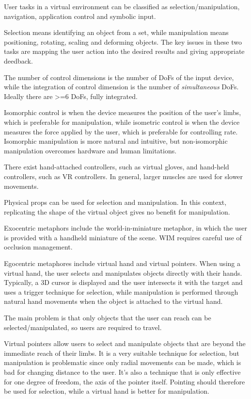 \documentclass[a4paper]{article}
\begin{document}
User tasks in a virtual environment can be classified as
selection/manipulation, navigation, application control and symbolic
input.

Selection means identifying an object from a set, while manipulation
means positioning, rotating, scaling and deforming objects. The key
issues in these two tasks are mapping the user action into the desired
results and giving appropriate deedback.

The number of control dimensions is the number of DoFs of the input
device, while the integration of control dimension is the number of
\emph{simultaneous} DoFs. Ideally there are \textgreater=6 DoFs, fully
integrated.

Isomorphic control is when the device measures the position of the
user's limbs, which is preferable for manipulation, while isometric
control is when the device measures the force applied by the user, which
is preferable for controlling rate. Isomorphic manipulation is more
natural and intuitive, but non-isomorphic manipulation overcomes
hardware and human limitations.

There exist hand-attached controllers, such as virtual gloves, and
hand-held controllers, such as VR controllers. In general, larger
muscles are used for slower movements.

Physical props can be used for selection and manipulation. In this
context, replicating the shape of the virtual object gives no benefit
for manipulation.

Exocentric metaphors include the world-in-miniature metaphor, in which
the user is provided with a handheld miniature of the scene. WIM
requires careful use of occlusion management.

Egocentric metaphores include virtual hand and virtual pointers. When
using a virtual hand, the user selects and manipulates objects directly
with their hands. Typically, a 3D cursor is displayed and the user
intersects it with the target and uses a trigger technique for
selection, while manipulation is performed through natural hand
movements when the object is attached to the virtual hand.

The main problem is that only objects that the user can reach can be
selected/manipulated, so users are required to travel.

Virtual pointers allow users to select and manipulate objects that are
beyond the immediate reach of their limbs. It is a very suitable
technique for selection, but manipulation is problematic since only
radial movements can be made, which is bad for changing distance to the
user. It's also a technique that is only effective for one degree of
freedom, the axis of the pointer itself. Pointing should therefore be
used for selection, while a virtual hand is better for manipulation.
\end{document}
